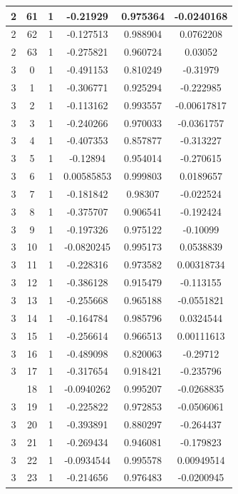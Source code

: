 \documentclass[12pt,a4paper]{article}
\numberwithin{equation}{section}
\numberwithin{figure}{section}
\numberwithin{table}{section}
\begin{document}
\begin{longtable}{|c|c|c|c|c|c|}
2 & 61 & 1 & -0.21929 & 0.975364 & -0.0240168 \\ \hline
2 & 62 & 1 & -0.127513 & 0.988904 & 0.0762208 \\ \hline
2 & 63 & 1 & -0.275821 & 0.960724 & 0.03052 \\ \hline
3 & 0 & 1 & -0.491153 & 0.810249 & -0.31979 \\ \hline
3 & 1 & 1 & -0.306771 & 0.925294 & -0.222985 \\ \hline
3 & 2 & 1 & -0.113162 & 0.993557 & -0.00617817 \\ \hline
3 & 3 & 1 & -0.240266 & 0.970033 & -0.0361757 \\ \hline
3 & 4 & 1 & -0.407353 & 0.857877 & -0.313227 \\ \hline
3 & 5 & 1 & -0.12894 & 0.954014 & -0.270615 \\ \hline
3 & 6 & 1 & 0.00585853 & 0.999803 & 0.0189657 \\ \hline
3 & 7 & 1 & -0.181842 & 0.98307 & -0.022524 \\ \hline
3 & 8 & 1 & -0.375707 & 0.906541 & -0.192424 \\ \hline
3 & 9 & 1 & -0.197326 & 0.975122 & -0.10099 \\ \hline
3 & 10 & 1 & -0.0820245 & 0.995173 & 0.0538839 \\ \hline
3 & 11 & 1 & -0.228316 & 0.973582 & 0.00318734 \\ \hline
3 & 12 & 1 & -0.386128 & 0.915479 & -0.113155 \\ \hline
3 & 13 & 1 & -0.255668 & 0.965188 & -0.0551821 \\ \hline
3 & 14 & 1 & -0.164784 & 0.985796 & 0.0324544 \\ \hline
3 & 15 & 1 & -0.256614 & 0.966513 & 0.00111613 \\ \hline
3 & 16 & 1 & -0.489098 & 0.820063 & -0.29712 \\ \hline
3 & 17 & 1 & -0.317654 & 0.918421 & -0.235796 \\ \hline
\pagebreak
3 & 18 & 1 & -0.0940262 & 0.995207 & -0.0268835 \\ \hline
3 & 19 & 1 & -0.225822 & 0.972853 & -0.0506061 \\ \hline
3 & 20 & 1 & -0.393891 & 0.880297 & -0.264437 \\ \hline
3 & 21 & 1 & -0.269434 & 0.946081 & -0.179823 \\ \hline
3 & 22 & 1 & -0.0934544 & 0.995578 & 0.00949514 \\ \hline
3 & 23 & 1 & -0.214656 & 0.976483 & -0.0200945 \\ \hline

\end{longtable}
\end{document}
